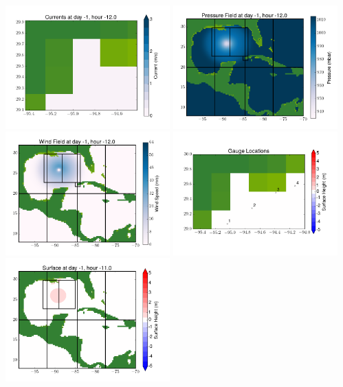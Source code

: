 \documentclass[11pt]{article}
\begin{document}
\vskip 10pt 
\includegraphics[width=0.475\textwidth]{frame0036fig7.png}
\includegraphics[width=0.475\textwidth]{frame0036fig8.png}
\vskip 10pt 
\includegraphics[width=0.475\textwidth]{frame0036fig9.png}
\includegraphics[width=0.475\textwidth]{frame0036fig10.png}
\vskip 10pt 
\includegraphics[width=0.475\textwidth]{frame0037fig1.png}
\end{document}
